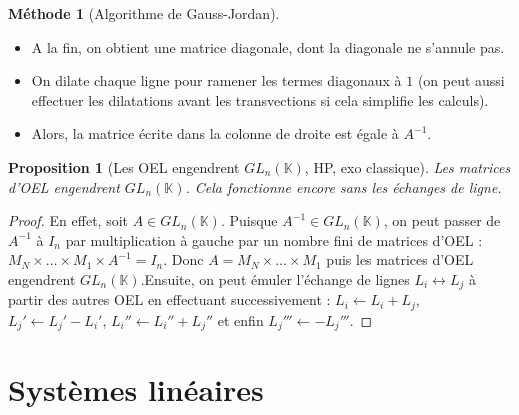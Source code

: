 \documentclass[french]{book}
\newcommand{\K}{\mathbb{K}}
\newcommand{\inv}{^{-1}}
\theoremstyle{plain}
\newtheorem{prop}{Proposition}[chapter]
\theoremstyle{definition}
\newtheorem{met}{Méthode}[chapter]
\theoremstyle{remark}
\begin{document}
\begin{met}[Algorithme de Gauss-Jordan]
\begin{itemize}
$$\begin{pmatrix}
		\end{pmatrix}$$et ainsi de suite. A chaque fois, on tombe directement sur un pivot non nul (c'est le terme diagonal), il n'y a plus besoin de permuter les lignes.
		\item A la fin, on obtient une matrice diagonale, dont la diagonale ne s'annule pas.
		\item On dilate chaque ligne pour ramener les termes diagonaux à $1$ (on peut aussi effectuer les dilatations avant les transvections si cela simplifie les calculs).
		\item Alors, la matrice écrite dans la colonne de droite est égale à $A\inv$.
	\end{itemize}
\end{met}
\begin{prop}[Les OEL engendrent $GL_n(\K)$, HP, exo classique]
	Les matrices d'OEL engendrent $GL_n(\K)$. Cela fonctionne encore sans les échanges de ligne. 
\end{prop}
\begin{proof}
	En effet, soit $A\in GL_n(\K)$. Puisque $A\inv\in GL_n(\K)$, on peut passer de $A\inv$ à $I_n$ par multiplication à gauche par un nombre fini de matrices d'OEL : $M_N\times\ldots\times M_1\times A\inv=I_n$. Donc $A=M_N\times\ldots\times M_1$ puis les matrices d'OEL engendrent $GL_n(\K)$.Ensuite, on peut émuler l'échange de lignes $L_i\leftrightarrow L_j$ à partir des autres OEL en effectuant successivement : $L_i\leftarrow L_i+L_j$, $L_j'\leftarrow L_j'-L_i'$, $L_i''\leftarrow L_i''+L_j''$ et enfin $L_j'''\leftarrow -L_j'''$.
\end{proof}

\section{Systèmes linéaires}
\end{document}
